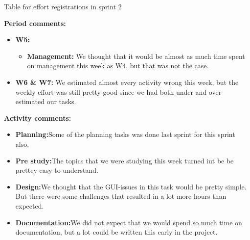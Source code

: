 \begin{table}
\caption{Table for effort registrations in sprint 2} \label{tab:effortweekss2}

\textbf{Period comments:}
\begin{itemize}
\item{}\textbf{W5:}
\begin{itemize}
\item{}\textbf{Management:} We thought that it would be almost as much time spent on management this week as W4, but that was not the case.
\end{itemize}
\item{}\textbf{W6 \& W7:} We estimated almost every activity wrong this week, but the weekly effort was still pretty good since we had both under and over estimated our tasks.
\end{itemize}

\textbf{Activity comments:}
\begin{itemize}
\item{}\textbf{Planning:}Some of the planning tasks was done last sprint for this sprint also.
\item{}\textbf{Pre study:}The topics that we were studying this week turned iut be be prettey easy to understand.
\item{}\textbf{Design:}We thought that the GUI-issues in this task would be pretty simple. But there were some challenges that resulted in a lot more hours than expected.
\item{}\textbf{Documentation:}We did not expect that we would spend so much time on documentation, but a lot could be written this early in the project.
\end{itemize}

\end{table}
